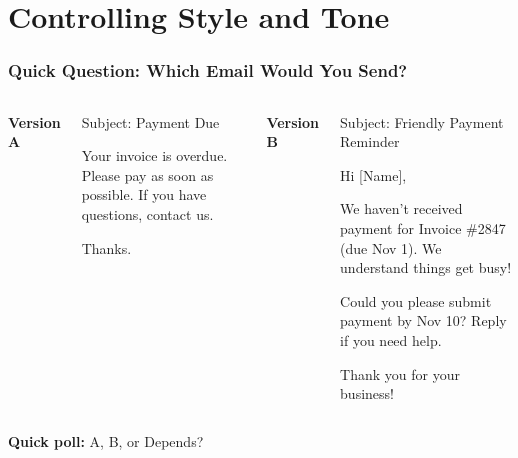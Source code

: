\documentclass{beamer}
\begin{document}
\section{Controlling Style and Tone}


\begin{frame}[fragile]
    \frametitle{Quick Question: Which Email Would You Send?}
    \begin{columns}[T]
        \textbf{Version A}
        \begin{block}{}
        {\small
        Subject: Payment Due
        
        Your invoice is overdue. Please pay as soon as possible. If you have questions, contact us.
        
        Thanks.
        }
        \end{block}
        
        \textbf{Version B}
        \begin{block}{}
        {\small
        Subject: Friendly Payment Reminder
        
        Hi [Name],
        
        We haven't received payment for Invoice \#2847 (due Nov 1). We understand things get busy!
        
        Could you please submit payment by Nov 10? Reply if you need help.
        
        Thank you for your business!
        }
        \end{block}
    \end{columns}
    \vspace{0.3cm}
    \textbf{Quick poll:} A, B, or Depends?
\end{frame}
\end{document}

